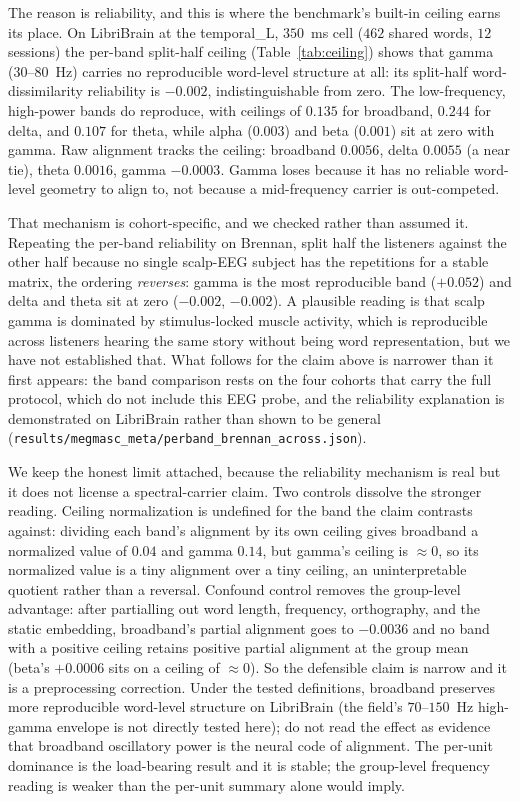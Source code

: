 \documentclass{article}
\begin{document}
The reason is reliability, and this is where the benchmark's built-in ceiling
earns its place. On LibriBrain at the temporal\_L, $350$~ms cell ($462$ shared
words, $12$ sessions) the per-band split-half ceiling (Table~\ref{tab:ceiling})
shows that gamma (30--80~Hz) carries no reproducible word-level structure at all: its
split-half word-dissimilarity reliability is $-0.002$, indistinguishable from
zero. The low-frequency, high-power bands do reproduce, with ceilings of $0.135$
for broadband, $0.244$ for delta, and $0.107$ for theta, while alpha ($0.003$)
and beta ($0.001$) sit at zero with gamma. Raw alignment tracks the ceiling:
broadband $0.0056$, delta $0.0055$ (a near tie), theta $0.0016$, gamma $-0.0003$.
Gamma loses because it has no reliable word-level geometry to align to, not
because a mid-frequency carrier is out-competed.

That mechanism is cohort-specific, and we checked rather than assumed it. Repeating the per-band
reliability on Brennan, split half the listeners against the other half because no single
scalp-EEG subject has the repetitions for a stable matrix, the ordering \emph{reverses}: gamma is
the most reproducible band ($+0.052$) and delta and theta sit at zero ($-0.002$, $-0.002$). A
plausible reading is that scalp gamma is dominated by stimulus-locked muscle activity, which is
reproducible across listeners hearing the same story without being word representation, but we
have not established that. What follows for the claim above is narrower than it first appears:
the band comparison rests on the four cohorts that carry the full protocol, which do not include
this EEG probe, and the reliability explanation is demonstrated on LibriBrain rather than shown to
be general (\texttt{results/megmasc\_meta/\allowbreak perband\_brennan\_across.json}).

We keep the honest limit attached, because the reliability mechanism is real but
it does not license a spectral-carrier claim. Two controls dissolve the stronger
reading. Ceiling normalization is undefined for the band the claim contrasts
against: dividing each band's alignment by its own ceiling gives broadband a
normalized value of $0.04$ and gamma $0.14$, but gamma's ceiling is
$\approx 0$, so its normalized value is a tiny alignment over a tiny ceiling, an
uninterpretable quotient rather than a reversal. Confound control removes the
group-level advantage: after partialling out word length, frequency, orthography,
and the static embedding, broadband's partial alignment goes to $-0.0036$ and no
band with a positive ceiling retains positive partial alignment at the group mean (beta's
$+0.0006$ sits on a ceiling of $\approx 0$). So the defensible claim
is narrow and it is a preprocessing correction. Under the tested definitions, broadband preserves more reproducible word-level
structure on LibriBrain (the field's $70$--$150$~Hz high-gamma envelope is not directly
tested here); do not
read the effect as evidence that broadband oscillatory power is the neural code of
alignment. The per-unit dominance is the load-bearing result and it is stable; the
group-level frequency reading is weaker than the per-unit summary alone would
imply.
\end{document}
